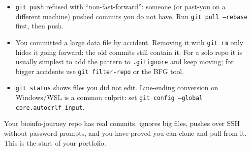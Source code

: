\begin{tipbox}
\begin{itemize}[nosep]
  \item \texttt{git push} refused with ``non-fast-forward'': someone (or past-you on a different machine) pushed commits you do not have. Run \texttt{git pull --rebase} first, then push.
  \item You committed a large data file by accident. Removing it with \texttt{git rm} only hides it going forward; the old commits still contain it. For a solo repo it is usually simplest to add the pattern to \texttt{.gitignore} and keep moving; for bigger accidents use \texttt{git filter-repo} or the BFG tool.
  \item \texttt{git status} shows files you did not edit. Line-ending conversion on Windows/WSL is a common culprit: set \texttt{git config --global core.autocrlf input}.
\end{itemize}
\end{tipbox}
\begin{winbox}[Checkpoint]
Your bioinfo-journey repo has real commits, ignores big files, pushes over SSH without password prompts, and you have proved you can clone and pull from it. This is the start of your portfolio.
\end{winbox}

